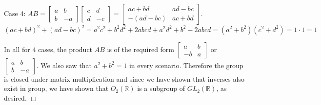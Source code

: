 \documentclass[12pt,letterpaper,reqno]{amsart}
\newcommand{\R}{\mathbb R}
\begin{document}
\begin{enumerate}
\begin{flushleft}
Case 4: $AB = \begin{bmatrix} a & b \\b & -a \end{bmatrix} \begin{bmatrix} c & d \\d & -c \end{bmatrix} = \begin{bmatrix} ac+bd & ad-bc \\-(ad-bc) & ac+bd \end{bmatrix}$. $(ac+bd)^2 + (ad - bc)^2 = a^2c^2 + b^2d^2 + 2abcd + a^2d^2 + b^2 - 2abcd = (a^2 + b^2)(c^2 + d^2) = 1 \cdot 1 = 1$\newline

In all for 4 cases, the product $AB$ is of the required form $\begin{bmatrix} a & b \\-b & a \end{bmatrix}$ or $\begin{bmatrix} a & b \\b & -a \end{bmatrix}$. We also saw that $a^2 + b^2 = 1$ in every scenario. Therefore the group is closed under matrix multiplication and since we have shown that inverses also exist in group, we have shown that $O_2(\R)$ is a subgroup of $GL_2(\R)$, as desired. $\Box$
\end{flushleft}

\end{enumerate}
\end{document}

